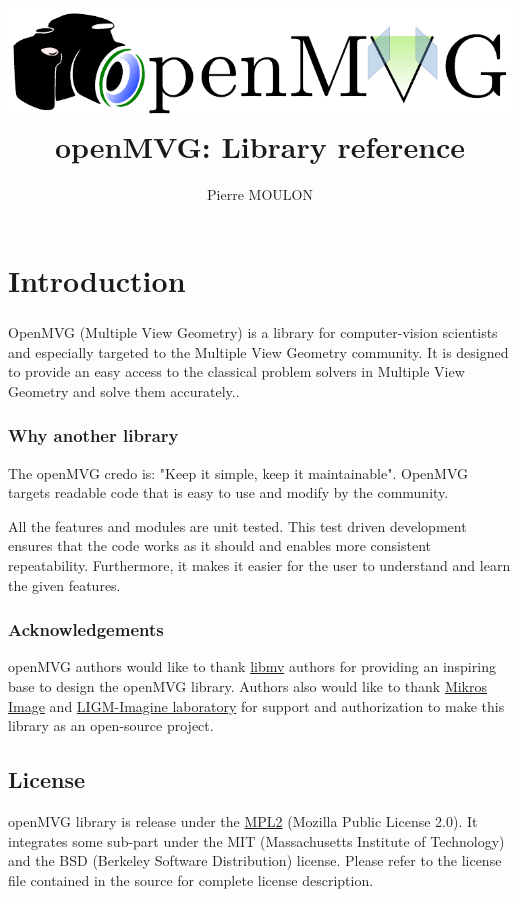 \documentclass[11pt, letterpaper]{report}
\title{\includegraphics{../logo/openMVG_Logo.pdf}\newline
openMVG: Library reference
}
\author{Pierre MOULON}
\begin{document}
\maketitle
\newpage
\tableofcontents
\newpage

\chapter{Introduction}

\paragraph{}
OpenMVG (Multiple View Geometry) is a library for computer-vision scientists and especially targeted to the Multiple View Geometry community. It is designed to provide an easy access to the classical problem solvers in Multiple View Geometry and solve them accurately..

\subsection*{Why another library}
The openMVG credo is: "Keep it simple, keep it maintainable". OpenMVG targets readable code that is easy to use and modify by the community.\newline

All the features and modules are unit tested. This test driven development ensures that the code works as it should and enables more consistent repeatability. Furthermore, it makes it easier for the user to understand and learn the given features.

\subsection*{Acknowledgements}

openMVG authors would like to thank \href{http://code.google.com/p/libmv/}{libmv} authors for providing an inspiring base to design the openMVG library. Authors also would like to thank \href{http://www.mikrosimage.eu/}{Mikros Image} and \href{http://imagine.enpc.fr/}{LIGM-Imagine laboratory} for support and authorization to make this library as an open-source project.

\section*{License}

openMVG library is release under the \href{http://www.mozilla.org/MPL/2.0/}{MPL2} (Mozilla Public License 2.0). It integrates some sub-part under the MIT (Massachusetts Institute of Technology) and the BSD (Berkeley Software Distribution) license. Please refer to the license file contained in the source for complete license description.
\end{document}
